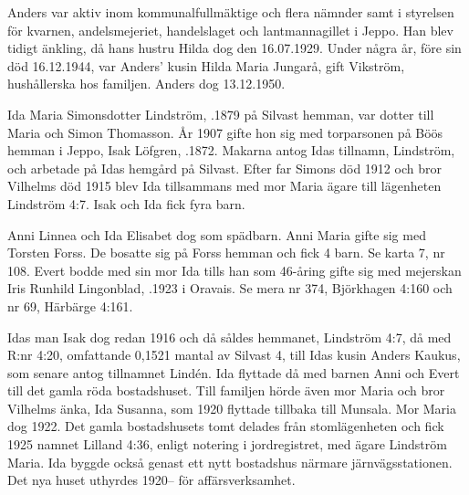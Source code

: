 Anders var aktiv inom kommunalfullmäktige och flera nämnder samt i styrelsen för kvarnen, andelsmejeriet, handelslaget och lantmannagillet i Jeppo. Han blev tidigt änkling, då hans hustru Hilda dog den 16.07.1929. Under några år, före sin död 16.12.1944, var Anders' kusin Hilda Maria Jungarå, gift Vikström, hushållerska hos familjen. Anders dog 13.12.1950.


%
Ida Maria Simonsdotter Lindström, .1879 på Silvast hemman, var dotter till Maria och Simon Thomasson. År 1907 gifte hon sig med torparsonen på Böös hemman i Jeppo, Isak Löfgren, .1872. Makarna antog Idas tillnamn, Lindström, och arbetade på Idas hemgård på Silvast. Efter far Simons död 1912 och bror Vilhelms död 1915 blev Ida tillsammans med mor Maria ägare till lägenheten Lindström 4:7. Isak och Ida fick fyra barn.
\begin{jhchildren}
  \item {}
  \item {}
  \item {}
  \item {}
\end{jhchildren}
Anni Linnea och Ida Elisabet dog som spädbarn. Anni Maria gifte sig med Torsten Forss. De bosatte sig på Forss hemman och fick 4 barn. Se karta 7, nr 108. Evert bodde med sin mor Ida tills han som 46-åring gifte sig med mejerskan Iris Runhild Lingonblad, .1923 i Oravais. Se mera nr 374, Björkhagen 4:160 och nr 69, Härbärge 4:161.

Idas man Isak dog redan 1916 och då såldes hemmanet, Lindström 4:7, då med R:nr 4:20, omfattande 0,1521 mantal av Silvast 4, till Idas kusin Anders Kaukus, som senare antog tillnamnet Lindén. Ida flyttade då med barnen Anni och Evert till det gamla röda bostadshuset. Till familjen hörde även mor Maria och bror Vilhelms änka, Ida Susanna, som 1920 flyttade tillbaka till Munsala. Mor Maria dog 1922. Det gamla bostadshusets tomt delades från stomlägenheten och fick 1925 namnet Lilland 4:36, enligt notering i jordregistret, med ägare Lindström Maria. Ida byggde också genast ett nytt bostadshus närmare järnvägsstationen. Det nya huset uthyrdes 1920-- för affärsverksamhet.


